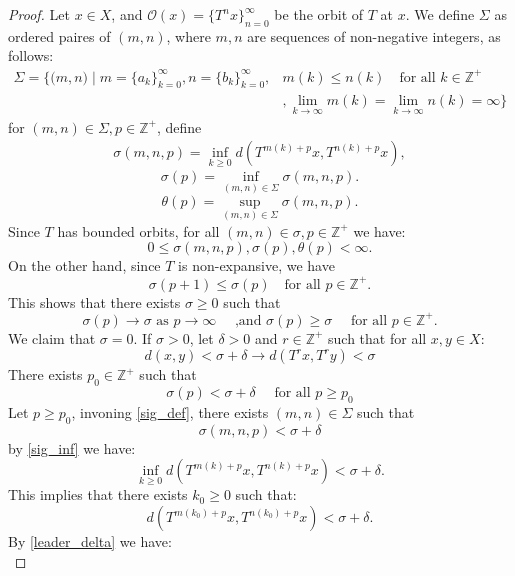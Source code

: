 \documentclass{birkjour}
\theoremstyle{definition}
\theoremstyle{remark}
\numberwithin{equation}{section}
\begin{document}
\begin{proof}Let $x\in X$, and $\mathcal{O}(x) =\{T^{n}x\}_{n=0}^{\infty}$ be the orbit of $T$ at $x$. We define $\Sigma$ as ordered paires of $(m,n)$, where $m,n$ are sequences of non-negative integers, as follows: 
\begin{equation}
 \begin{aligned}
    \Sigma = \Big\{ 
        \big( m, n \big) \;\big|\;
           m=\{a_k\}_{k=0}^{\infty}, n=\{b_k\}_{k=0}^{\infty}, &  m(k)\leq n(k)\quad\text{for all }k\in \mathbb{Z}^{+}\\
 & ,\lim_{k\to\infty} m(k) = \lim_{k\to\infty} n(k) = \infty
          \Big\}
  \end{aligned}
\end{equation}
for $(m,n)\in \Sigma, p\in \mathbb{Z}^{+}$, define
\begin{align}\label{sig_inf}
\sigma(m,n,p) = \inf_{k\geq 0}d(T^{m(k)+p}x,T^{n(k)+p}x),
\end{align}
\begin{equation}\label{sig_def}
\sigma(p) = \inf_{(m,n)\in \Sigma}\sigma(m,n,p).
\end{equation}
\begin{equation}\label{theta_sup}
\theta(p) = \sup_{(m,n)\in \Sigma}\sigma(m,n,p).
\end{equation}
Since $T$ has bounded orbits, for all $(m,n)\in \sigma, p\in \mathbb{Z}^{+} $ we have:
\[
0\le \sigma(m,n,p), \sigma(p),\theta(p)<\infty.
\]
 On the other hand, since $T$ is non-expansive, we have
\[
\sigma(p+1)\leq \sigma(p)\quad \text{for all }p\in \mathbb{Z}^{+}.
\]
This shows that there exists $\sigma\geq 0$ such that 
\[
\sigma(p)\to \sigma \text{ as }p\to \infty\quad\text{ ,and }\sigma(p)\geq  \sigma\quad\text{ for all }p\in \mathbb{Z}^{+}.
\]
We claim that $\sigma =0$. If $\sigma>0$, let $\delta>0$ and $r\in \mathbb{Z}^{+}$ such that for all $x,y\in X$:
\begin{equation}\label{leader_delta}
d(x,y)<\sigma+\delta\rightarrow d(T^{r}x,T^{r}y) <  \sigma
\end{equation}
There exists $p_0\in \mathbb{Z}^{+}$ such that
\[
\sigma(p)<\sigma+\delta\quad\text{ for all }p\ge p_0
\]
Let $p\ge p_{0}$, invoning \eqref{sig_def}, there exists $(m,n)\in \Sigma$ such that
\[
\sigma(m,n,p)<\sigma+\delta
\]
by \eqref{sig_inf} we have:
\[
\inf_{k\geq 0}d(T^{m(k)+p}x,T^{n(k)+p}x)<\sigma+\delta.
\]
This implies that there exists $k_0\ge 0$ such that:
\[
d(T^{m(k_0)+p}x,T^{n(k_0)+p}x)<\sigma+\delta.
\]
By \eqref{leader_delta} we have:
\begin{equation}\label{lead_1}

\end{equation}
\end{proof}
\end{document}
